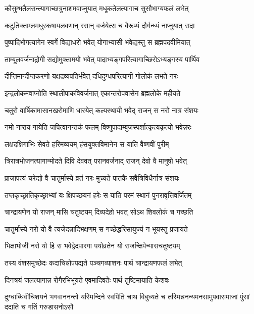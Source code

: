 \twolineshloka
{कौसुम्भतैलसन्त्यागाच्छत्रुनाशमवाप्नुयात्}
{मधूकतेलत्यागाच सुसौभाग्यफलं लभेत्} %

\twolineshloka
{कटुतिक्ताम्लमधुरकषायलवणान् रसान्}
{वर्जयेत्स च वैरूप्यं दौर्गन्ध्यं नाप्नुयात् सदा} %

\twolineshloka
{पुष्पादिभोगत्यागेन स्वर्गे विद्याधरो भवेत्}
{योगाभ्यासी भवेद्यस्तु स ब्रह्मपदवीमियात्} %

\twolineshloka
{ताम्बूलवर्जनाद्रोगी सद्योमुक्तामयो भवेत्}
{पादाभ्यङ्गपरित्यागाच्छिरोऽभ्यङ्गस्य पार्थिव} %

\twolineshloka
{दीप्तिमान्दीप्तकरणो यक्षद्रव्यपतिर्भवेत्}
{दधिदुग्धपरित्यागी गोलोकं लभते नरः} %

\twolineshloka
{इन्द्रलोकमवाप्नोति स्थालीपाकविवर्जनात्}
{एकान्तरोपवासेन ब्रह्मलोके महीयते} %

\twolineshloka
{चतुरो वार्षिकामासानखरोमाणि धारयेत्}
{कल्पस्थायी भवेद् राजन् स नरो नात्र संशयः} %

\twolineshloka
{नमो नाराय गायेति जपित्वानन्तकं फलम्}
{विष्णुपादाम्बुजस्पर्शात्कृत्यकृत्यो भवेन्नरः} %

\twolineshloka
{लक्षदक्षिगाभिः सेवते हरिमव्ययम्}
{हंसयुक्तविमानेन स याति वैष्णवीं पुरीम्} %

\twolineshloka
{त्रिरात्रभोजनत्यागान्मोदते दिवि देववत्}
{परानवर्जनाद् राजन् देवो वै मानुषो भवेत्} %

\twolineshloka
{प्राजापत्यं चरेद्यो वै चातुर्मास्ये व्रतं नरः}
{मुच्यते पातकै सवैत्रिविधैर्नात्र संशयः} %

\twolineshloka
{तप्तकृच्छ्रातिकृच्छ्राभ्यां यः क्षिपच्छयनं हरेः}
{स याति परमं स्थानं पुनरावृत्तिवर्जितम्} %

\twolineshloka
{चान्द्रायणेन यो राजन् मासि चतुष्टयम्}
{दिव्यदेहो भवत् सोऽथ शिवलोकं च गच्छति} %

\twolineshloka
{चातुर्मास्ये नरो यो वै त्यजेदन्नादिभक्षणम्}
{स गच्छेद्धरिसायुज्यं न भूयस्तु प्रजायते} %

\twolineshloka
{भिक्षाभोजी नरो यो हि स भवेद्वेदपारगा}
{पयोव्रतेन यो राजन्क्षिपेन्मासचतुष्टयम्} %

\twolineshloka
{तस्य वंशसमुच्छेदः कदाचिन्नोपपद्यते}
{पञ्चगव्याशनः पार्थ चान्द्रायणफलं लभेत्} %

\twolineshloka
{दिनत्रयं जलत्यागान्न रोगैरभिभूयते}
{एवमादिवतेः पार्थ तुष्टिमायाति केशवः} %

\fourlineindentedshloka
{दुग्धाब्धिवीचिशयने भगवाननन्तो}
{यस्मिन्दिने स्वपिति चाथ विबुध्यते च}
{तस्मिन्ननन्यमनसामुपवासमाजां}
{पुंसां ददाति च गतिं गरुडासनोऽसौ} %

